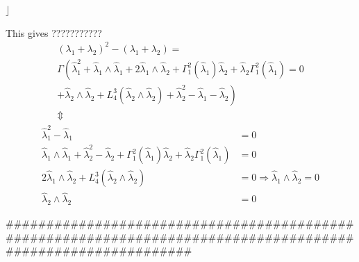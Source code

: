 \documentclass[aps,preprint]{revtex4}%
\begin{document}
$\rfloor$

This gives ???????????
\begin{gather}
\left(  \lambda_{1}+\lambda_{2}\right)  ^{2}-\left(  \lambda_{1}+\lambda
_{2}\right)  =\nonumber\\
\Gamma\left(  \hat{\lambda}_{1}^{2}+\hat{\lambda}_{1}\wedge\hat{\lambda}%
_{1}+2\hat{\lambda}_{1}\wedge\hat{\lambda}_{2}+\Gamma_{1}^{2}\left(
\hat{\lambda}_{1}\right)  \hat{\lambda}_{2}+\hat{\lambda}_{2}\Gamma_{1}%
^{2}\left(  \hat{\lambda}_{1}\right)  \right.  =0\nonumber\\
\left.  +\hat{\lambda}_{2}\wedge\hat{\lambda}_{2}+L_{4}^{3}\left(
\hat{\lambda}_{2}\wedge\hat{\lambda}_{2}\right)  +\hat{\lambda}_{2}^{2}%
-\hat{\lambda}_{1}-\hat{\lambda}_{2}\right) \\
\Updownarrow\nonumber
\end{gather}%
\begin{align}
\hat{\lambda}_{1}^{2}-\hat{\lambda}_{1}  &  =0\nonumber\\
\hat{\lambda}_{1}\wedge\hat{\lambda}_{1}+\hat{\lambda}_{2}^{2}-\hat{\lambda
}_{2}+\Gamma_{1}^{2}\left(  \hat{\lambda}_{1}\right)  \hat{\lambda}_{2}%
+\hat{\lambda}_{2}\Gamma_{1}^{2}\left(  \hat{\lambda}_{1}\right)   &
=0\nonumber\\
2\hat{\lambda}_{1}\wedge\hat{\lambda}_{2}+L_{4}^{3}\left(  \hat{\lambda}%
_{2}\wedge\hat{\lambda}_{2}\right)   &  =0\Rightarrow\hat{\lambda}_{1}%
\wedge\hat{\lambda}_{2}=0\nonumber\\
\hat{\lambda}_{2}\wedge\hat{\lambda}_{2}  &  =0
\end{align}


\bigskip\#\#\#\#\#\#\#\#\#\#\#\#\#\#\#\#\#\#\#\#\#\#\#\#\#\#\#\#\#\#\#\#\#\#\#\#\#\#\#\#\#\#\#\#\#\#\#\#\#\#\#\#\#\#\#\#\#\#\#\#\#\#\#\#\#\#\#\#\#\#\#\#\#\#\#\#\#\#\#\#\#\#\#\#\#\#\#\#\#\#\#\#\#\#\#\#\#\#\#\#\#\#\#\#\#\#\#\#\#%
\end{document}
